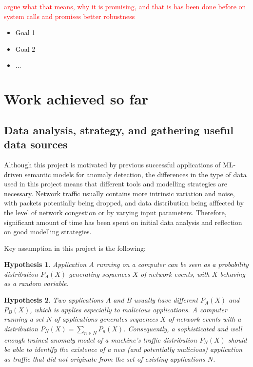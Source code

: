 \documentclass[a4paper,12pt,twoside]{report}
\newtheorem{hypothesis}{Hypothesis}
\begin{document}
 \textcolor{red}{argue what that means, why it is promising, and that is has been done before on system calls and promises better robustness}

\begin{itemize}
\item Goal 1
\item Goal 2
\item ...
\end{itemize}



\section{Work achieved so far}


\subsection{Data analysis, strategy, and gathering useful data sources}

Although this project is motivated by previous successful applications of ML-driven semantic models for anomaly detection, the differences in the type of data used in this project means that different tools and modelling strategies are necessary. Network traffic usually contains more intrinsic variation and noise, with packets potentially being dropped, and data distribution being afffected by the level of network congestion or by varying input parameters. Therefore, significant amount of time has been spent on initial data analysis and reflection on good modelling strategies. 

Key assumption in this project is the following:

\begin{hypothesis}\label{Ass1}
Application $A$ running on a computer can be seen as a probability distribution $P_A(X)$ generating sequences $X$ of network events, with $X$ behaving as a random variable.
\end{hypothesis}

\begin{hypothesis}\label{Ass2}
Two applications $A$ and $B$ usually have different $P_A(X)$ and $P_B(X)$, which is applies especially to malicious applications. A computer running a set $N$ of applications%
generates sequences $X$ of network events with a distribution $P_N(X)=\sum_{n\in N}P_n(X)$. Consequently, a sophisticated and well enough trained anomaly model of a machine's traffic distribution $P_N(X)$ should be able to identify the existence of a new (and potentially malicious) application as traffic that did not originate from the set of existing applications $N$.
\end{hypothesis}
\end{document}
